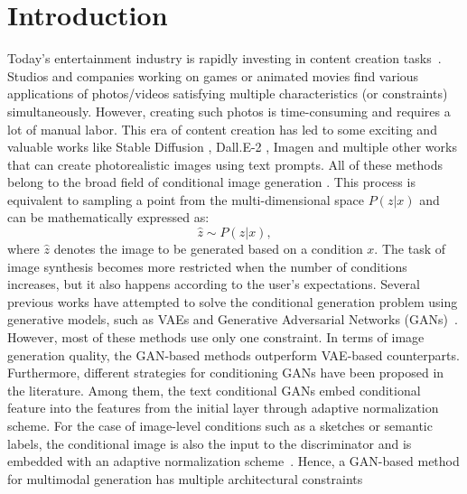\documentclass[10pt,twocolumn,letterpaper]{article}
\begin{document}
\section{Introduction}
Today's entertainment industry is rapidly investing
in content creation tasks~\cite{park2019SPADE,huang2022multimodal}. Studios and companies working on games or animated movies find various applications of photos/videos satisfying multiple characteristics (or constraints) simultaneously. However, creating such photos is time-consuming and requires a lot of manual labor.
This era of content creation has led to some exciting and valuable works like Stable Diffusion \cite{rombach2022high}, Dall.E-2 \cite{ramesh2022hierarchical}, Imagen \cite{saharia2022photorealistic} and multiple other works that can create photorealistic images using text prompts. All of these methods belong to the broad field of conditional image generation \cite{sohl2015deep,radford2015unsupervised}. 
This process is equivalent to sampling a point from the  multi-dimensional space $P(z|x)$ and can be mathematically expressed as:
\setlength{\belowdisplayskip}{0pt} \setlength{\belowdisplayshortskip}{0pt}
\setlength{\abovedisplayskip}{0pt} \setlength{\abovedisplayshortskip}{0pt}
\begin{equation}
\hat{z} \sim P(z|x),
\end{equation}
where $\hat{z}$ denotes the image to be generated based on a condition $x$. 
The task of image synthesis becomes more restricted when the number of conditions increases, but it also happens according to the user's expectations. Several previous works have attempted to solve the conditional generation problem using generative models, such as VAEs \cite{kingma2013auto,radford2015unsupervised} and Generative Adversarial Networks (GANs)~\cite{goodfellow2020generative,sohn2015learning}. However, most of these methods use only one constraint.
In terms of image generation quality, the GAN-based methods outperform VAE-based counterparts. Furthermore, different strategies for conditioning GANs have been proposed in the literature. Among them, the text conditional GANs \cite{tang2021attentiongan,ramesh2021zero, chen2020dmgan,xia2021tedigan} embed conditional feature into the features from the initial layer through adaptive normalization scheme. For the case of image-level conditions such as a sketches or semantic labels, the conditional image is also the input to the discriminator and is embedded with an adaptive normalization scheme~\cite{park2019SPADE,tan2021diverse,wang2018pix2pixHD,oasis}. Hence, a GAN-based method for multimodal generation has multiple architectural constraints \cite{huang2021multimodal}
\end{document}
